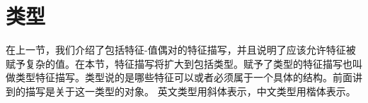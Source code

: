 \section{类型}
\label{sec-formalismus-typen}

在上一节，我们介绍了包括特征-值偶对的特征描写，并且说明了应该允许特征被赋予复杂的值。在本节，特征描写将扩大到包括类型。赋予了类型的特征描写也叫做类型特征描写。类型说的是哪些特征可以或者必须属于一个具体的结构。前面讲到的描写是关于这一类型的对象。
\ea
{}
\z
英文类型用斜体表示，中文类型用楷体表示。

